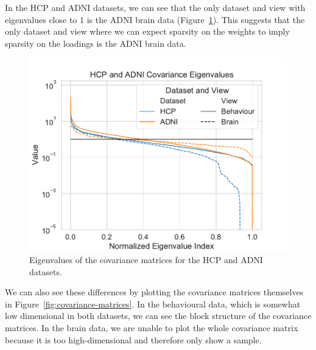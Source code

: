 In the HCP and ADNI datasets, we can see that the only dataset and view with eigenvalues close to 1 is the ADNI brain data (Figure~\ref{fig:covariance-eigenvalues}).
This suggests that the only dataset and view where we can expect sparsity on the weights to imply sparsity on the loadings is the ADNI brain data.

\begin{figure}
\centering
\includegraphics[width=0.8\linewidth]{figures/regularization/covariance/hcp_adni_covariance_eigenvalues}
\caption{Eigenvalues of the covariance matrices for the HCP and ADNI datasets.}\label{fig:covariance-eigenvalues}
\end{figure}

We can also see these differences by plotting the covariance matrices themselves in Figure~\ref{fig:covariance-matrices}.
In the behavioural data, which is somewhat low dimensional in both datasets, we can see the block structure of the covariance matrices.
In the brain data, we are unable to plot the whole covariance matrix because it is too high-dimensional and therefore only show a sample.


